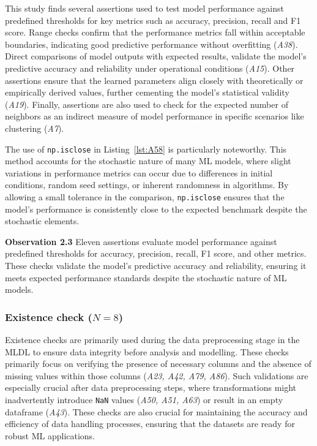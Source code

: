 \documentclass[journal]{IEEEtran}       %
\newcommand{\highlight}[1]{
  \begin{framed}%
    \noindent#1
\end{framed}}
\begin{document}
This study finds several assertions used to test model performance
against predefined thresholds for key metrics such as accuracy,
precision, recall and F1 score. Range checks confirm that the
performance metrics fall within acceptable boundaries, indicating
good predictive performance without overfitting (\emph{A38}). Direct
comparisons of model outputs with expected results, validate the
model's predictive accuracy and reliability under operational
conditions (\emph{A15}). Other assertions ensure that the learned
parameters align closely with theoretically or empirically derived
values, further cementing the model’s statistical validity
(\emph{A19}). Finally, assertions are also used to check for the
expected number of neighbors as an indirect measure of model
performance in specific scenarios like clustering (\emph{A7}).

The use of \lstinline{np.isclose} in Listing~\ref{lst:A58} is
particularly noteworthy. This method accounts for the stochastic
nature of many ML models, where slight variations in performance
metrics can occur due to differences in initial conditions, random
seed settings, or inherent randomness in algorithms. By allowing a
small tolerance in the comparison, \lstinline{np.isclose} ensures
that the model's performance is consistently close to the expected
benchmark despite the stochastic elements.

\highlight{\textbf{Observation 2.3} Eleven assertions evaluate model
  performance against predefined thresholds for accuracy, precision,
  recall, F1 score, and other metrics. These checks validate the
  model's predictive accuracy and reliability, ensuring it meets
expected performance standards despite the stochastic nature of ML models.}

\subsubsection{Existence check ($N = 8$)}

Existence checks are primarily used during the data preprocessing
stage in the MLDL to ensure data integrity before analysis and
modelling. These checks primarily focus on verifying the presence of
necessary columns and the absence of missing values within those
columns (\emph{A23, A42, A79, A86}). Such validations are especially
crucial after data preprocessing steps, where transformations might
inadvertently introduce \lstinline{NaN} values (\emph{A50, A51, A63})
or result in an empty dataframe (\emph{A43}). These checks are also
crucial for maintaining the accuracy and efficiency of data handling
processes, ensuring that the datasets are ready for robust ML applications.
\end{document}
